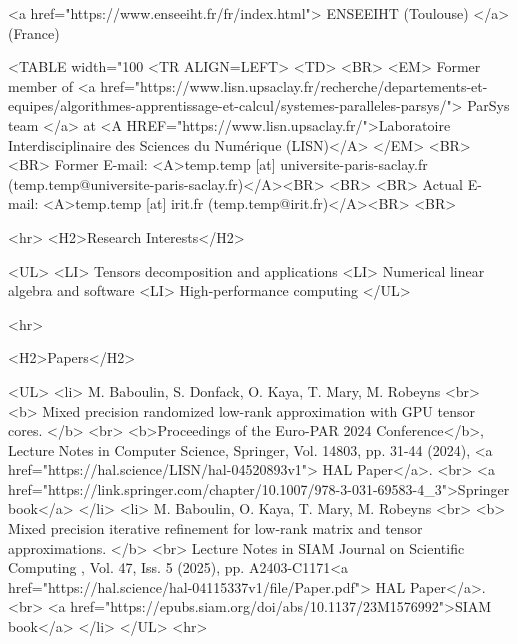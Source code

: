             <a href="https://www.enseeiht.fr/fr/index.html">
                ENSEEIHT (Toulouse)
            </a> (France)

        <TABLE width="100%
            <TR ALIGN=LEFT>
                <TD>
                    <BR>
                    <EM>
                        Former member of
                        <a
                            href="https://www.lisn.upsaclay.fr/recherche/departements-et-equipes/algorithmes-apprentissage-et-calcul/systemes-paralleles-parsys/">
                            ParSys team
                        </a>
                        at <A HREF="https://www.lisn.upsaclay.fr/">Laboratoire Interdisciplinaire des Sciences du
                            Numérique (LISN)</A>
                    </EM>
                    <BR>
                    <BR>
                    Former E-mail: <A>temp.temp [at] universite-paris-saclay.fr
                        (temp.temp@universite-paris-saclay.fr)</A><BR>
                    <BR>
                    <BR>
                        Actual E-mail: <A>temp.temp [at] irit.fr
                            (temp.temp@irit.fr)</A><BR>
                    <BR>

                    <hr>
                    <H2>Research Interests</H2>

                    <UL>
                        <LI> Tensors decomposition and applications
                        <LI> Numerical linear algebra and software
                        <LI> High-performance computing
                    </UL>

                    <hr>

                    <H2>Papers</H2>

                    <UL>
                        <li>
                            M. Baboulin, S. Donfack, O. Kaya, T. Mary, M. Robeyns <br>
                            <b> Mixed precision randomized low-rank approximation with GPU tensor cores.
                            </b>
                            <br>
                            <b>Proceedings of the Euro-PAR 2024 Conference</b>,
                            Lecture Notes in Computer Science, Springer, Vol. 14803, pp. 31-44 (2024), <a
                                href="https://hal.science/LISN/hal-04520893v1"> HAL Paper</a>. <br>
                            <a href="https://link.springer.com/chapter/10.1007/978-3-031-69583-4_3">Springer book</a> </li>
                        <li>
                            M. Baboulin, O. Kaya, T. Mary, M. Robeyns <br>
                            <b> Mixed precision iterative refinement for low-rank matrix and tensor approximations.
                            </b>
                            <br>
                            Lecture Notes in SIAM Journal on Scientific Computing , Vol. 47, Iss. 5 (2025), pp. A2403-C1171<a
                                href="https://hal.science/hal-04115337v1/file/Paper.pdf"> HAL Paper</a>. <br>
                            <a href="https://epubs.siam.org/doi/abs/10.1137/23M1576992">SIAM book</a> </li>
                    </UL>
                    <hr>


